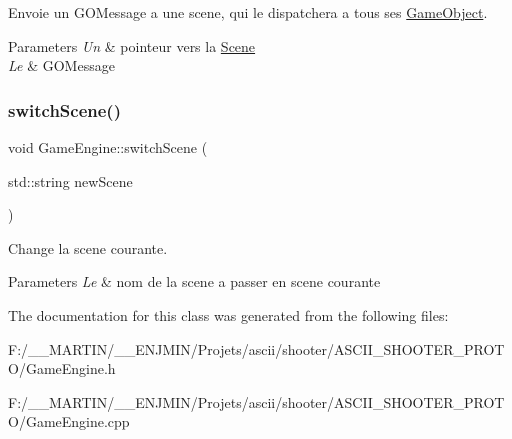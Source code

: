 Envoie un G\+O\+Message a une scene, qui le dispatchera a tous ses \hyperlink{class_game_object}{Game\+Object}. 


\begin{DoxyParams}{Parameters}
{\em Un} & pointeur vers la \hyperlink{class_scene}{Scene} \\
\hline
{\em Le} & G\+O\+Message \\
\hline
\end{DoxyParams}
\hypertarget{class_game_engine_a000c4cc070830d727f349b094ab402e3}{}\label{class_game_engine_a000c4cc070830d727f349b094ab402e3} 
\subsubsection{\texorpdfstring{switch\+Scene()}{switchScene()}}
{\footnotesize\ttfamily void Game\+Engine\+::switch\+Scene (\begin{DoxyParamCaption}\item[{std\+::string}]{new\+Scene }\end{DoxyParamCaption})}



Change la scene courante. 


\begin{DoxyParams}{Parameters}
{\em Le} & nom de la scene a passer en scene courante \\
\hline
\end{DoxyParams}


The documentation for this class was generated from the following files\+:\begin{DoxyCompactItemize}
\item 
F\+:/\+\_\+\+\_\+\+M\+A\+R\+T\+I\+N/\+\_\+\+\_\+\+E\+N\+J\+M\+I\+N/\+Projets/ascii/shooter/\+A\+S\+C\+I\+I\+\_\+\+S\+H\+O\+O\+T\+E\+R\+\_\+\+P\+R\+O\+T\+O/Game\+Engine.\+h\item 
F\+:/\+\_\+\+\_\+\+M\+A\+R\+T\+I\+N/\+\_\+\+\_\+\+E\+N\+J\+M\+I\+N/\+Projets/ascii/shooter/\+A\+S\+C\+I\+I\+\_\+\+S\+H\+O\+O\+T\+E\+R\+\_\+\+P\+R\+O\+T\+O/Game\+Engine.\+cpp\end{DoxyCompactItemize}
